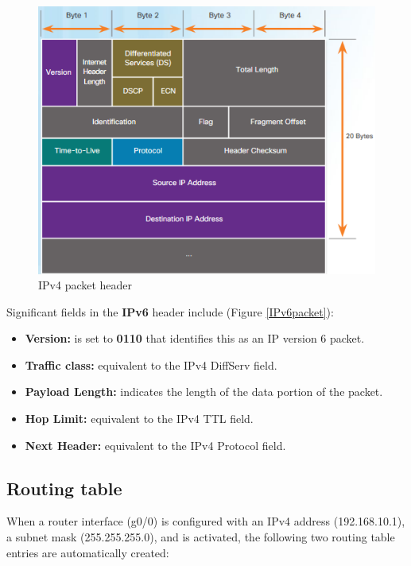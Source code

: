 {\begin{figure}[hbtp]
\caption{IPv4 packet header}\label{IPv4packet}
\centering
\includegraphics[scale=0.6]{pictures/IPv4packet.PNG}
\end{figure}

Significant fields in the \textbf{IPv6} header include (Figure \ref{IPv6packet}):

\begin{itemize}
\item \textbf{Version:} is set to \textbf{0110} that identifies this as an IP version 6 packet.

\item \textbf{Traffic class:} equivalent to the IPv4 DiffServ field.

\item \textbf{Payload Length:} indicates the length of the data portion of the packet.

\item \textbf{Hop Limit:} equivalent to the IPv4 TTL field.

\item \textbf{Next Header:} equivalent to the IPv4 Protocol field.
\end{itemize}

\subsection{Routing table}

When a router interface (g0/0) is configured with an IPv4 address (192.168.10.1), a subnet mask (255.255.255.0), and is activated, the following two routing table entries are automatically created:

}
